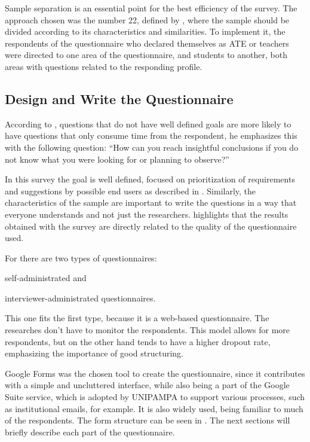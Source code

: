 Sample separation is an essential point for the best efficiency of the survey. The approach chosen was the number 22, defined by \textcite{Jefferson}, where the sample should be divided according to its characteristics and similarities. To implement it, the respondents of the questionnaire who declared themselves as \ac{ATE} or teachers were directed to one area of the questionnaire, and students to another, both areas with questions related to the responding profile.

\subsection{Design and Write the Questionnaire}\label{sec:survey-questionnaire}

According to \textcite[p. 34]{kasunic2005designing}, questions that do not have well defined goals are more likely to have questions that only consume time from the respondent, he emphasizes this with the following question: ``How can you reach insightful conclusions if you do not know what you were looking for or planning to observe?''

In this survey the goal is well defined, focused on prioritization of requirements and suggestions by possible end users as described in . Similarly, the characteristics of the sample are important to write the questions in a way that everyone understands and not just the researchers. \textcite{surveyGuidelines} highlights that the results obtained with the survey are directly related to the quality of the questionnaire used.

For \textcite{surveyGuidelines} there are two types of questionnaires:
\begin{inparaenum}[(i)]
  \item self-administrated and
  \item interviewer-administrated questionnaires.
\end{inparaenum}
This one fits the first type, because it is a web-based questionnaire. The researches don't have to monitor the respondents. This model allows for more respondents, but on the other hand tends to have a higher dropout rate, emphasizing the importance of good structuring.

Google Forms was the chosen tool to create the questionnaire, since it contributes with a simple and uncluttered interface, while also being a part of the Google Suite service, which is adopted by \ac{UNIPAMPA} to support various processes, such as institutional emails, for example. It is also widely used, being familiar to much of the respondents. The form structure can be seen in . The next sections will briefly describe each part of the questionnaire.

